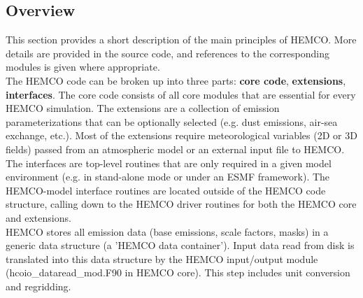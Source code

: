 \documentclass[12pt,a4paper]{article} %
\begin{document}
\subsection{Overview}
This section provides a short description of the main principles of HEMCO. More details are provided in the source code, and references to the corresponding modules is given where appropriate.\\
The HEMCO code can be broken up into three parts: \textbf{core code}, \textbf{extensions}, \textbf{interfaces}. The core code consists of all core modules that are essential for every HEMCO simulation. The extensions are a collection of emission parameterizations that can be optionally selected (e.g. dust emissions, air-sea exchange, etc.). Most of the extensions require meteorological variables (2D or 3D fields) passed from an atmospheric model or an external input file to HEMCO. The interfaces are top-level routines that are only required in a given model environment (e.g. in stand-alone mode or under an ESMF framework). The HEMCO-model interface routines are located outside of the HEMCO code structure, calling down to the HEMCO driver routines for both the HEMCO core and extensions.\\
HEMCO stores all emission data (base emissions, scale factors, masks) in a generic data structure (a 'HEMCO data container'). Input data read from disk is translated into this data structure by the HEMCO input/output module (hcoio\_dataread\_mod.F90 in HEMCO core). This step includes unit conversion and regridding.
\end{document}

